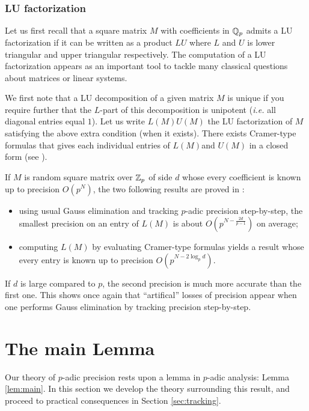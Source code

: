 \documentclass{lms}
\begin{document}
\subsubsection*{LU factorization}


Let us first recall that a square matrix $M$ with coefficients in $\mathbb Q_p$ 
admits a LU factorization if it can be written as a product $LU$ where 
$L$ and $U$ is lower triangular and upper triangular respectively. 
The computation of a LU factorization appears as an important tool to 
tackle many classical questions about matrices or linear systems.

We first note that a LU decomposition of a given matrix $M$ is unique
if you require further that the $L$-part of this decomposition is
unipotent (\emph{i.e.} all diagonal entries equal $1$). Let us write
$L(M) U(M)$ the LU factorization of $M$ satisfying the above extra
condition (when it exists). There exists Cramer-type formulas that
gives each individual entries of $L(M)$and $U(M)$ in a closed form
(see \cite{caruso:12a	}).

If $M$ is random square matrix over $\mathbb Z_p$ of side $d$ whose every
coefficient is known up to precision $O(p^N)$, the two following
results are proved in \cite{caruso:12a}:
\begin{itemize}
\item using usual Gauss elimination and tracking $p$-adic precision 
step-by-step, the smallest precision on an entry of $L(M)$ is about
$O(p^{N - \frac{2d}{p-1}})$ on average;
\item computing $L(M)$ by evaluating Cramer-type formulas yields a
result whose every entry is known up to precision $O(p^{N - 2 \log_p 
d})$.
\end{itemize}
If $d$ is large compared to $p$, the second precision is much more
accurate than the first one. This shows once again that ``artifical''
losses of precision appear when one performs Gauss elimination by
tracking precision step-by-step.

\section{The main Lemma}
\label{sec:mainlemma}

Our theory of $p$-adic precision rests upon a 
lemma in $p$-adic analysis: Lemma \ref{lem:main}.  In this section
we develop the theory surrounding this result, and proceed to practical
consequences in Section \ref{sec:tracking}.
\end{document}
